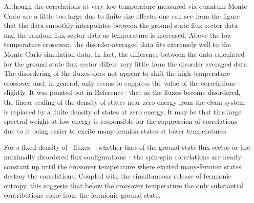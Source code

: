 Although the correlations at very low temperature measured via quantum Monte Carlo are a little too large due to finite size effects, one can see from the figure that the data smoothly interpolates between the ground state flux sector data and the random flux sector data as temperature is increased.
Above the low-temperature crossover, the disorder-averaged data fits extremely well to the Monte Carlo simulation data.
In fact, the difference between the data calculated for the ground state flux sector differs very little from the disorder averaged data.
The disordering of the fluxes does not appear to shift the high-temperature crossover and, in general, only seems to suppress the value of the correlations slightly.
It was pointed out in Reference~\cite{NasuPRB2015} that as the fluxes become disordered, the linear scaling of the density of states near zero energy from the clean system is replaced by a finite density of states at zero energy. 
It may be that this large spectral weight at low energy is responsible for the suppression of correlations due to it being easier to excite many-fermion states at lower temperatures.

For a fixed density of \ZZ~fluxes -- whether that of the ground state flux sector or the maximally disordered flux configurations -- the spin-spin correlations are nearly constant up until the crossover temperature where excited many-fermion states destroy the correlations.
Coupled with the simultaneous release of fermionic entropy, this suggests that below the crossover temperature the only substantial contributions come from the fermionic ground state.

